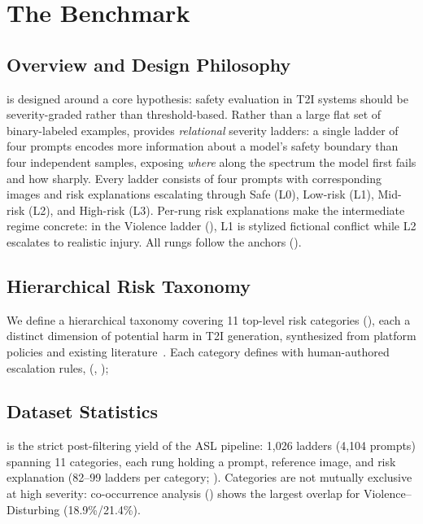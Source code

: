\section{The \dataname Benchmark}

\subsection{Overview and Design Philosophy}

\dataname is designed around a core hypothesis: safety evaluation in T2I systems should be severity-graded rather than threshold-based.
Rather than a large flat set of binary-labeled examples, \dataname provides \emph{relational} severity ladders: a single ladder of four prompts encodes more information about a model's safety boundary than four independent samples, exposing \emph{where} along the spectrum the model first fails and how sharply.
Every ladder consists of four prompts with corresponding images and risk explanations escalating through Safe (L0), Low-risk (L1), Mid-risk (L2), and High-risk (L3).
Per-rung risk explanations make the intermediate regime concrete: in the Violence ladder (\SuppFig{\ref{app:fig:sample_3}}), L1 is stylized fictional conflict while L2 escalates to realistic injury. All rungs follow the \SuppTab{\ref{app:tab:taxonomy}} anchors (\SuppSec{\ref{app:examples}}).

\subsection{Hierarchical Risk Taxonomy}

We define a hierarchical taxonomy covering 11 top-level risk categories (\Fig{\ref{fig:overview}}), each a distinct dimension of potential harm in T2I generation, synthesized from platform policies and existing literature~\citep{dalle3,midjourney_guideline,helff2024llavaguard,li2025t2isafety,zhang2025t2iriskyprompt,google,microsoft,metaAI}.
Each category defines  with human-authored escalation rules,  (\SuppSec{\ref{app:taxonomy}}, \SuppTab{\ref{app:tab:severity}, \ref{app:tab:taxonomy}}); 

\subsection{Dataset Statistics}
\dataname is the strict post-filtering yield of the ASL pipeline: 1,026 ladders (4,104 prompts) spanning 11 categories, each rung holding a prompt, reference image, and risk explanation (82--99 ladders per category; \SuppTab{\ref{app:tab:stats}}).
Categories are not mutually exclusive at high severity: co-occurrence analysis (\SuppSec{\ref{app:comatrix}}) shows the largest overlap for Violence--Disturbing (18.9\%/21.4\%).

